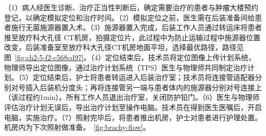 （1）病人经医生诊断、治疗正当性判断后，确定需要治疗的患者与肿瘤大楼预约登记，以确定模拟定位和治疗时间。（2）模拟定位之前，医生需在后装准备间给患者施行无菌施源器置入术。（3）施源器置入完成，后装工作人员通过转运床将患者推至放疗科大孔径 CT机房，拍摄定位片，此过程中为防止运输过程中施源器位置改变，后装准备室至放疗科大孔径CT机房地面平坦，选择最优路径，路径见图~\ref{fig:ch2-5-f2-c568cd97}。（4）定位结束后，技术员将定位图像上传计划系统，物理师导出定位图像，通过治疗计划系统（TPS）医生与物理师共同制定治疗计划。（5）定位结束后，护士将患者转运进入后装治疗室；技术员将连接管适配器分别对号插入后装机分度头；再将连接管另一端与患者体内的施源器分别对号连接上（该过程约1min）。所有工作人员退出治疗室，关闭防护铅门。（6）医生与物理师评估治疗计划无误后，导出治疗计划至操作电脑。技术员在得到医生医嘱后，开启电脑，实施治疗。（7）照射完毕后，将患者推出机房，护士对患者进行护理处置。机房内为下次照射做准备。~\ref{fig:brachy-flow}。


